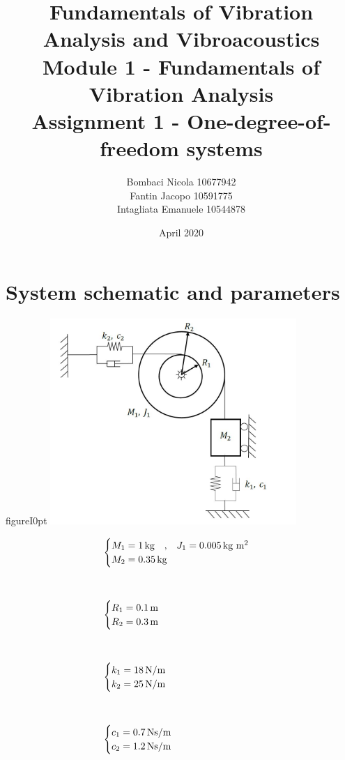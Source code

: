\documentclass[a4paper,12pt,oneside]{article}
\title{Fundamentals of Vibration Analysis and Vibroacoustics \\
Module 1 - Fundamentals of Vibration Analysis \\
Assignment 1 - One-degree-of-freedom systems}
\author{Bombaci Nicola 10677942 \\
Fantin Jacopo 10591775 \\
Intagliata Emanuele 10544878}
\date{April 2020}
\begin{document}
\maketitle

\vspace{60pt}

\section*{System schematic and parameters}

\begin{wrapfloat}{figure}{I}{0pt}
	\includegraphics[width=0.7\textwidth]{system_schematic}
\end{wrapfloat}

\[ \begin{split}
	& \begin{cases}
		M_1 = 1 \, \text{kg} \quad \text{,} \quad
			J_1 = 0.005 \, \text{kg m $ \! \! ^2 $} \\
		M_2 = 0.35 \, \text{kg}
	\end{cases} \\[30pt]
	& \begin{cases}
		R_1 = 0.1 \, \text{m} \\
		R_2 = 0.3 \, \text{m}
	\end{cases} \\[30pt]
	& \begin{cases}
		k_1 = 18 \, \text{N/m} \\
		k_2 = 25 \, \text{N/m}
	\end{cases} \\[30pt]
	& \begin{cases}
		c_1 = 0.7 \, \text{Ns/m} \\
		c_2 = 1.2 \, \text{Ns/m}
	\end{cases}
\end{split} \]
\end{document}
